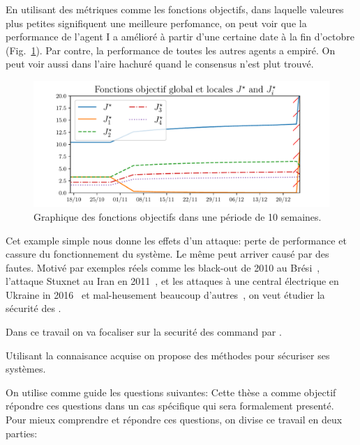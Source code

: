 \documentclass[../main.tex]{subfiles}
\begin{document}
En utilisant des métriques comme les fonctions objectifs, dans laquelle valeures plus petites signifiquent une meilleure perfomance, on peut voir que la performance de l'agent I a amélioré à partir d'une certaine date à la fin d'octobre (Fig.~\ref{fig:change_in_j_fr}).
Par contre, la performance de toutes les autres agents a empiré.
On peut voir aussi dans l'aire hachuré quand le consensus n'est plut trouvé.
\begin{figure}[h]
  \centering
  \includegraphics[width=.8\textwidth]{../img/example_introduction/example_J_fr.pdf}
  \caption{Graphique des fonctions objectifs dans une période de 10 semaines.}\label{fig:change_in_j_fr}
\end{figure}

Cet example simple nous donne les effets d'un attaque: perte de performance et cassure du fonctionnement du système.
Le même peut arriver causé par des fautes.
Motivé par exemples réels comme les black-out de 2010 au Brési~\cite{Conti2010}, l'attaque Stuxnet au Iran en 2011~\cite{Langner2011}, et les attaques à une central électrique en Ukraine in 2016~\cite{Bindra2017} et mal-heusement beaucoup d'autres~\cite{DingEtAl2018,DibajiEtAl2019}, on veut étudier la sécurité des \cps{}.

Dans ce travail on va focaliser sur la securité des \cps{} command par \dmpc{}.

Utilisant la connaisance acquise on propose des méthodes pour sécuriser ses systèmes.

On utilise comme guide les questions suivantes:
Cette thèse a comme objectif répondre ces questions dans un cas spécifique qui sera formalement presenté.
Pour mieux comprendre et répondre ces questions, on divise ce travail en deux parties:
\end{document}
